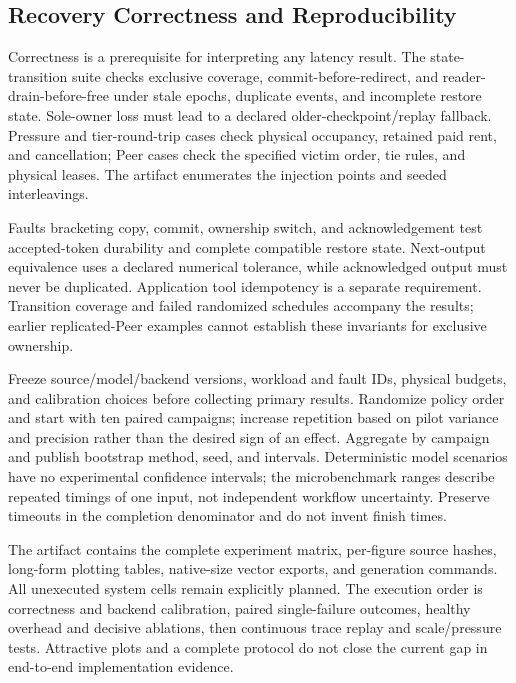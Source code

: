 \subsection{Recovery Correctness and Reproducibility}
\label{sec:eval-plan}

Correctness is a prerequisite for interpreting any latency result. The
state-transition suite checks exclusive coverage, commit-before-redirect,
and reader-drain-before-free under stale epochs, duplicate events, and
incomplete restore state. Sole-owner loss must lead to a declared
older-checkpoint/replay fallback. Pressure and tier-round-trip cases
check physical occupancy, retained paid rent, and cancellation; Peer
cases check the specified victim order, tie rules, and physical leases.
The artifact enumerates the injection points and seeded interleavings.

Faults bracketing copy, commit, ownership switch, and acknowledgement
test accepted-token durability and complete compatible restore state.
Next-output equivalence uses a declared numerical tolerance, while
acknowledged output must never be duplicated. Application tool
idempotency is a separate requirement. Transition coverage and failed
randomized schedules accompany the results; earlier replicated-Peer
examples cannot establish these invariants for exclusive ownership.

Freeze source/model/backend versions, workload and fault IDs, physical
budgets, and calibration choices before collecting primary results.
Randomize policy order and start with ten paired campaigns; increase
repetition based on pilot variance and precision rather than the desired
sign of an effect. Aggregate by campaign and publish bootstrap method,
seed, and intervals. Deterministic model scenarios have no experimental
confidence intervals; the microbenchmark ranges describe repeated
timings of one input, not independent workflow uncertainty. Preserve
timeouts in the completion denominator and do not invent finish times.

The artifact contains the complete experiment matrix, per-figure source
hashes, long-form plotting tables, native-size vector exports, and
generation commands. All unexecuted system cells remain explicitly
planned. The execution order is correctness and backend calibration,
paired single-failure outcomes, healthy overhead and decisive ablations,
then continuous trace replay and scale/pressure tests. Attractive plots
and a complete protocol do not close the current gap in end-to-end
implementation evidence.
